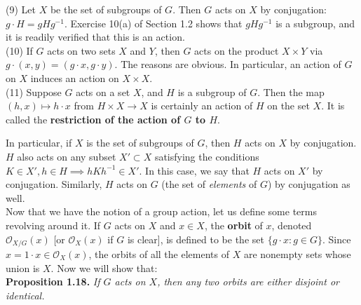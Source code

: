 \documentclass[leqno]{book}
\begin{document}
(9) Let $X$ be the set of subgroups of $G$.  Then $G$ acts on $X$ by conjugation: $g\cdot H=gHg^{-1}$.  Exercise 10(a) of Section 1.2 shows that $gHg^{-1}$ is a subgroup, and it is readily verified that this is an action.\\

(10) If $G$ acts on two sets $X$ and $Y$, then $G$ acts on the product $X\times Y$ via $g\cdot(x,y)=(g\cdot x,g\cdot y)$.  The reasons are obvious.  In particular, an action of $G$ on $X$ induces an action on $X\times X$.\\

(11) Suppose $G$ acts on a set $X$, and $H$ is a subgroup of $G$.  Then the map $(h,x)\mapsto h\cdot x$ from $H\times X\to X$ is certainly an action of $H$ on the set $X$.  It is called the \textbf{restriction of the action of $G$ to $H$}.

In particular, if $X$ is the set of subgroups of $G$, then $H$ acts on $X$ by conjugation.  $H$ also acts on any subset $X'\subset X$ satisfying the conditions $K\in X',h\in H\implies hKh^{-1}\in X'$.  In this case, we say that $H$ acts on $X'$ by conjugation.  Similarly, $H$ acts on $G$ (the set of \emph{elements} of $G$) by conjugation as well.\\

\noindent Now that we have the notion of a group action, let us define some terms revolving around it.  If $G$ acts on $X$ and $x\in X$, the \textbf{orbit} of $x$, denoted $\mathcal O_{X/G}(x)$ [or $\mathcal O_X(x)$ if $G$ is clear], is defined to be the set $\{g\cdot x:g\in G\}$.  Since $x=1\cdot x\in\mathcal O_X(x)$, the orbits of all the elements of $X$ are nonempty sets whose union is $X$.  Now we will show that:\\

\noindent\textbf{Proposition 1.18.} \emph{If $G$ acts on $X$, then any two orbits are either disjoint or identical.}\\
\end{document}
